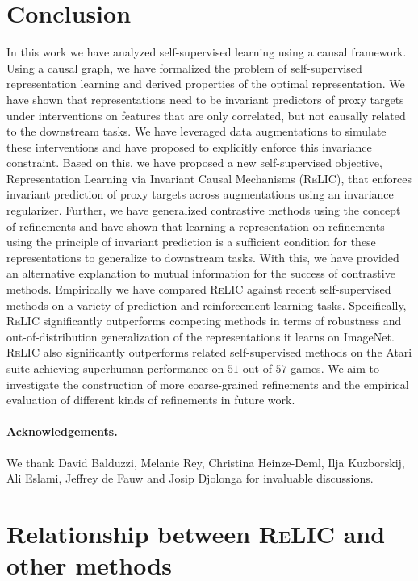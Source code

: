 \documentclass{article}
\newcommand{\relic}{\textsc{ReLIC}}
\begin{document}
 \section{Conclusion}

In this work we have analyzed self-supervised learning using a causal framework. 
Using a causal graph, we have formalized the problem of self-supervised representation learning and derived properties of the optimal representation.
We have shown that representations need to be invariant predictors of proxy targets under interventions on features that are only correlated, but not causally related to the downstream tasks.
We have leveraged data augmentations to simulate these interventions and have proposed to explicitly enforce this invariance constraint.
Based on this, we have proposed a new self-supervised objective, Representation Learning via Invariant Causal Mechanisms (\relic{}), that enforces invariant prediction of proxy targets across augmentations using an invariance regularizer.
Further, we have generalized contrastive methods using the concept of refinements and have shown that learning a representation on refinements using the principle of invariant prediction is a sufficient condition for these representations to generalize to downstream tasks.
With this, we have provided an alternative explanation to mutual information for the success of contrastive methods.
Empirically we have compared \relic{} against recent self-supervised methods on a variety of prediction and reinforcement learning tasks.
Specifically, \relic{} significantly outperforms competing methods in terms of robustness and out-of-distribution generalization of the representations it learns on ImageNet. \relic{} also significantly outperforms related self-supervised methods on the Atari suite achieving superhuman performance on $51$ out of $57$ games.
We aim to investigate the construction of more coarse-grained refinements and the empirical evaluation of different kinds of refinements in future work.
 
\paragraph{Acknowledgements.} We thank David Balduzzi, Melanie Rey, Christina Heinze-Deml, Ilja Kuzborskij, Ali Eslami, Jeffrey de Fauw and Josip Djolonga for invaluable discussions.





\appendix
\onecolumn
\section{Relationship between \relic{} and other methods} \label{sec:relationship}
\end{document}
